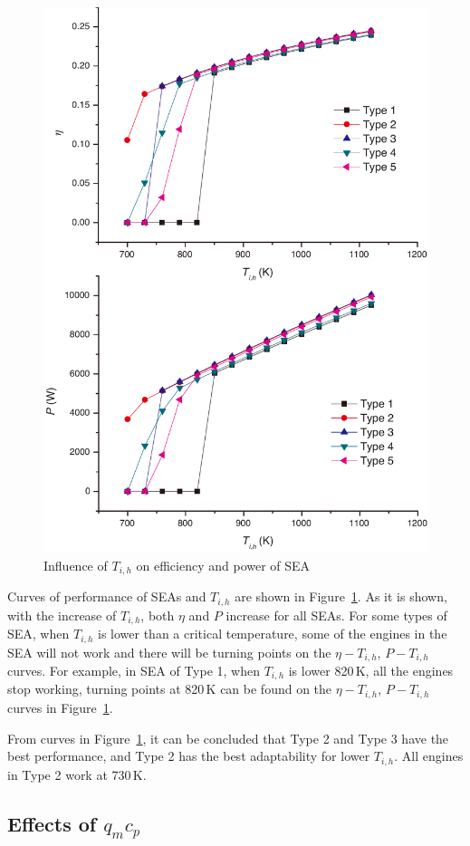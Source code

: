 \documentclass[review,3p,10t]{elsarticle}
\begin{document}
\noindent \begin{figure}[htbp]
\begin{center}
	\includegraphics[width = 0.7\columnwidth]{./graphics/T_ih}
	\caption{Influence of $T_{i,h}$ on efficiency and power of SEA}
	\label{fig:Ti_h}
\end{center}
\end{figure}

Curves of performance of SEAs and $T_{i,h}$ are shown in Figure~\ref{fig:Ti_h}.
As it is shown, with the increase of $T_{i,h}$, both $\eta$ and $P$ increase for all SEAs. For some types of SEA, when $T_{i,h}$ is lower than a critical temperature, some of the engines in the SEA will not work and there will be turning points on the $\eta-T_{i,h}$, $P-T_{i,h}$ curves. For example, in SEA of Type 1, when $T_{i,h}$ is lower 820\,K, all the engines stop working, turning points at 820\,K can be found on the $\eta-T_{i,h}$, $P-T_{i,h}$ curves in Figure~\ref{fig:Ti_h}. 

From curves in Figure~\ref{fig:Ti_h}, it can be concluded that Type 2 and Type 3 have the best performance, and Type 2 has the best adaptability for lower $T_{i,h}$. All engines in Type 2 work at 730\,K.

\subsection{Effects of $q_mc_p$}
\end{document}
